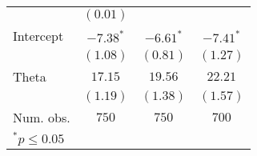 \begin{table}
\begin{center}
\begin{tabular}{l c c c}
                            & $(0.01)$    &                & \\
Intercept                   & $-7.38^{*}$ & $-6.61^{*}$        &$-7.41^{*}$\\
                            & $(1.08)$    & $(0.81)$       &$(1.27)$\\
Theta                       & $17.15$     & $19.56$        &$22.21$\\
                            & $(1.19)$      & $(1.38)$       &$(1.57)$\\
\hline
Num. obs.                   & $750$         & $750$          &$700$\\
\hline
\multicolumn{3}{l}{\scriptsize{$^*p\leq0.05$}}
\end{tabular}
\end{center}
\end{table}
